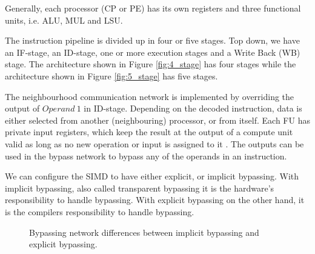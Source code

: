 Generally, each processor (CP or PE) has its own registers and three functional units, i.e. ALU, MUL and LSU. 

The instruction pipeline is divided up in four or five stages. Top down, we have an IF-stage, an ID-stage, one or more execution stages and a Write Back (WB) stage. The architecture shown in Figure \ref{fig:4_stage} has four stages while the architecture shown in Figure \ref{fig:5_stage} has five stages.

The neighbourhood communication network is implemented by overriding the output of $Operand\ 1$ in ID-stage. Depending on the decoded instruction, data is either selected from another (neighbouring) processor, or from itself. Each FU has private input registers, which keep the result at the output of a compute unit valid as long as no new operation or input is assigned to it \cite{dongrio1}. The outputs can be used in the bypass network to bypass any of the operands in an instruction. 

We can configure the SIMD to have either explicit, or implicit bypassing. With implicit bypassing, also called transparent bypassing it is the hardware's responsibility to handle bypassing. With explicit bypassing on the other hand, it is the compilers responsibility to handle bypassing.

\begin{figure}[H]
\centering
{}
\hfil
{}
\caption{Bypassing network differences between implicit bypassing and explicit bypassing.}
\label{fig:datapath_approaches}
\end{figure}

